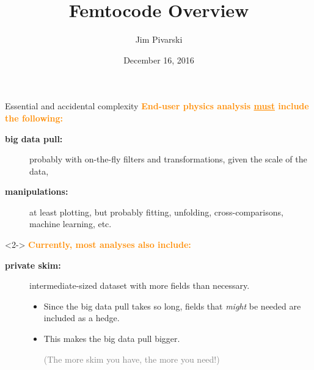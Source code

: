 \documentclass{beamer}
\title[2016-12-16-femtocode-overview]{Femtocode Overview}
\author{Jim Pivarski}
\institute{Princeton University -- DIANA}
\date{December 16, 2016}
\begin{document}

\begin{frame}
  \titlepage
\end{frame}



\begin{frame}{Essential and accidental complexity}
\vspace{0.25 cm}
\textcolor{darkorange}{\bf End-user physics analysis \underline{must} include the following:}
\begin{description}
\item[\bf big data pull:] probably with on-the-fly filters and transformations, given the scale of the data,
\item[\bf manipulations:] at least plotting, but probably fitting, unfolding, cross-comparisons, machine learning, etc.
\end{description}

\vfill
\begin{uncoverenv}<2->
\textcolor{darkorange}{\bf Currently, most analyses also include:}
\begin{description}
\item[\bf private skim:] intermediate-sized dataset with more fields than necessary.
\begin{itemize}
\item Since the big data pull takes so long, fields that {\it might} be needed are included as a hedge.
\item This makes the big data pull bigger.

\textcolor{gray}{(The more skim you have, the more you need!)}
\end{itemize}
\end{description}
\end{uncoverenv}
\end{frame}
\end{document}
